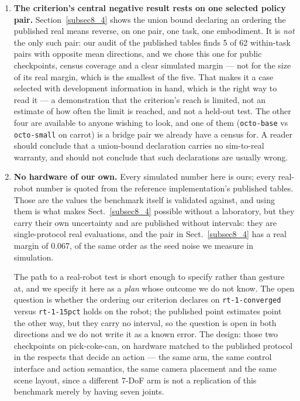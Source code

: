 \documentclass[pdflatex,iicol,sn-apa]{sn-jnl}
\theoremstyle{remark}
\begin{document}
\begin{enumerate}
\item \textbf{The criterion's central negative result rests on one selected policy pair.}
Section~\ref{subsec8_4} shows the union bound declaring an ordering the published real means
reverse, on one pair, one task, one embodiment. It is \emph{not} the only such pair: our audit of the
published tables finds 5 of 62 within-task pairs with opposite mean directions, and we chose this one
for public checkpoints, census coverage and a clear simulated margin --- not for the size of its
real margin, which is the smallest of the five. That makes it a case
selected with development information in hand, which is the right way to read it --- a demonstration
that the criterion's reach is limited, not an estimate of how often the limit is reached, and not a
held-out test. The other four are available to anyone wishing to look, and one of them
(\texttt{octo-base} vs \texttt{octo-small} on carrot) is a bridge pair we already have a census for.
A reader should conclude that a union-bound declaration carries no sim-to-real warranty, and should
not conclude that such declarations are usually wrong.

\item \textbf{No hardware of our own.} Every simulated number here is ours; every real-robot number
is quoted from the reference implementation's published tables. Those are the values the benchmark
itself is validated against, and using them is what makes Sect.~\ref{subsec8_4} possible without a
laboratory, but they carry their own uncertainty and are published without intervals: they are
single-protocol real
evaluations, and the pair in Sect.~\ref{subsec8_4} has a real margin of 0.067, of the same order as
the seed noise we measure in simulation.

The path to a real-robot test is short enough to specify rather than gesture at, and we specify it
here as a \emph{plan} whose outcome we do not know. The open question is whether the ordering our
criterion declares on \texttt{rt-1-converged} versus \texttt{rt-1-15pct} holds on the robot; the
published point estimates point the other way, but they carry no interval, so the question is open
in both directions and we do not write it as a known error. The design: those two checkpoints on
pick-coke-can, on hardware matched to the published protocol in the respects that decide an action
--- the same arm, the same control interface and action semantics, the same camera placement and the
same scene layout, since a different 7-DoF arm is not a replication of this benchmark merely by
having seven joints.


\end{enumerate}
\end{document}
